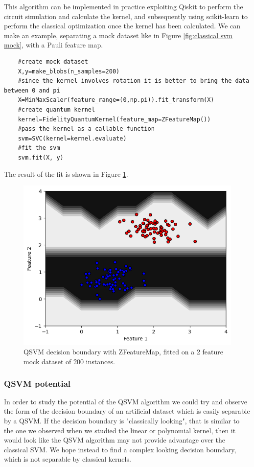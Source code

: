 \documentclass[a4paper]{article}
\begin{document}
This algorithm can be implemented in practice exploiting Qiskit to perform the circuit simulation and calculate the kernel, and subsequently using scikit-learn to perform the classical optimization once the kernel has been calculated. We can make an example, separating a mock dataset like in Figure \ref{fig:classical svm mock}, with a Pauli feature map. 

\begin{lstlisting}
    #create mock dataset
    X,y=make_blobs(n_samples=200) 
    #since the kernel involves rotation it is better to bring the data between 0 and pi
    X=MinMaxScaler(feature_range=(0,np.pi)).fit_transform(X) 
    #create quantum kernel
    kernel=FidelityQuantumKernel(feature_map=ZFeatureMap()) 
    #pass the kernel as a callable function 
    svm=SVC(kernel=kernel.evaluate) 
    #fit the svm
    svm.fit(X, y) 
\end{lstlisting}

The result of the fit is shown in Figure \ref{fig:qsvm}.
\begin{figure}[h!]
    \centering
    \includegraphics[width=\textwidth]{images/qsvm.png}
    \caption{QSVM decision boundary with ZFeatureMap, fitted on a 2 feature mock dataset of 200 instances.}
    \label{fig:qsvm}
\end{figure}

\subsubsection{QSVM potential}
In order to study the potential of the QSVM algorithm we could try and observe the form of the decision boundary of an artificial dataset which is easily separable by a QSVM. If the decision boundary is "classically looking", that is similar to the one we observed when we studied the linear or polynomial kernel, then it would look like the QSVM algorithm may not provide advantage over the classical SVM. We hope instead to find a complex looking decision boundary, which is not separable by classical kernels. 
\end{document}
